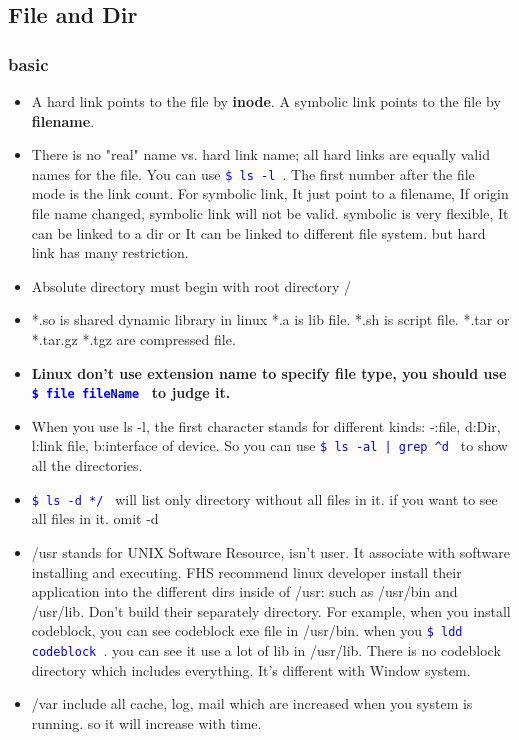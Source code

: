 \documentclass[a4paper,12pt,twoside]{book}
\newcommand{\linuxcommand}[1]{\texttt{\textcolor{blue}{\$ #1 \Pisymbol{psy}{191}}}}
\begin{document}
\subsection{File and Dir}
\subsubsection{basic}
\begin{itemize}
\item A hard link points to the file by \textbf{inode}.  A symbolic link points to the file by \textbf{filename}. 
 
\item  There is no "real" name vs. hard link name; all hard links are equally valid names for the file. You can use \linuxcommand{ls -l}. The first number after the file mode is the link count.  For symbolic link, It just point to a filename, If origin file name changed, symbolic link will not be valid.   symbolic is very flexible,  It can be linked to a dir or It can be linked to different file system. but hard link has many restriction. 

\item Absolute directory must begin with root directory /
    \item *.so is shared dynamic library in linux *.a is lib file.  *.sh is script file. *.tar or
        *.tar.gz *.tgz are compressed file.
     \item \textbf{Linux don't use extension name to specify file type, you should use \linuxcommand{file fileName} to judge it. }
     \item When you use ls -l, the first character stands for different kinds: -:file, d:Dir,
         l:link file, b:interface of device. So you can use \linuxcommand{ls -al | grep \^{}d} to show all the directories. 
	 \item \linuxcommand{ls -d */} will list only directory without all files in it. if you want to see all files in it. omit -d
     \item /usr stands for UNIX Software Resource, isn't user. It associate with software
         installing and executing. FHS recommend linux developer install their application into the different dirs inside of /usr:  such as /usr/bin and /usr/lib. Don't build their separately directory.  For example, when you install codeblock, you can see codeblock exe file in /usr/bin. when you \linuxcommand{ldd codeblock}. you can see it use a lot of lib in /usr/lib. There is no codeblock directory which includes everything.  It's different with Window system.
         \item /var include all cache, log, mail which are increased when you system is running. so it will increase with time. 
         

\end{itemize}
\end{document}
